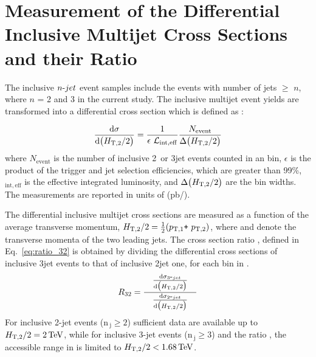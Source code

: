 \chapter{Measurement of the Differential Inclusive Multijet Cross Sections and their Ratio}
\label{chap:measurement}
The inclusive $n\mbox{-} jet$ event samples include the events with number of jets $\geq$ $n$, where $n$ = 2 and 3 in the current study. The inclusive multijet event yields are transformed into a differential cross section which is defined as :

\begin{equation}
 \label{eq:inclusive_formula}
 {\dd{\sigma}{\big(\httwo\big)}} = \frac{1}{\epsilon~\lumi_{\mathrm{int,eff}}}\frac{N_\mathrm{event}}{\Delta\big(\httwo\big)}
\end{equation}
where $N_\mathrm{event}$ is the number of inclusive 2\hy~or 3\hy jet events counted in an \httwo bin, $\epsilon$ is the product of the trigger and jet selection efficiencies, which are greater than 99\%, \lumins$_{\mathrm{int,eff}}$ is the effective integrated luminosity, and $ \Delta\big(H_{\mathrm{T,2}}/2\big)$ are the bin widths. The measurements are reported in units of (pb/\GeV).

The differential inclusive multijet cross sections are measured as a function of the average transverse momentum, $\httwo = \frac{1}{2}(\ptone\plus \pttwo)$, where \ptone and \pttwo denote the transverse momenta of the two leading jets. The cross section ratio \ratio, defined in Eq.~\ref{eq:ratio_32} is obtained by dividing the differential cross sections of inclusive 3\hy jet events to that of inclusive 2\hy jet one, for each bin in \httwo.
\begin{equation}
 \label{eq:ratio_32}
 \ratio = \frac[10pt]{{\dd{\sigma_{3\hy jet}}{\big(\httwo\big)}}}{\dd{\sigma_{2\hy jet}}{\big(\httwo\big)}}
\end{equation}
For inclusive 2-jet events ($\mathrm {n_{~j}} \geq 2$) sufficient data are available up to $H_{\mathrm{T,2}}/2 = 2\,\text{Te\hspace{-.08em}V}$, while for inclusive 3-jet events ($\mathrm {n_{~j}} \geq 3$) and the ratio \ratio, the accessible range in \httwo is limited to $H_{\mathrm{T,2}}/2 < 1.68\,\text{Te\hspace{-.08em}V}$.

